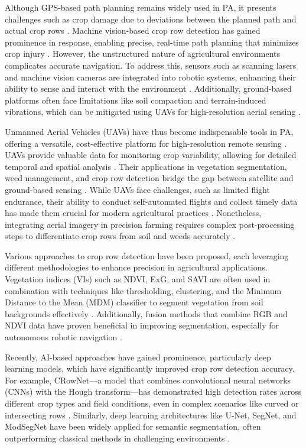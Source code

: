 \documentclass[conference]{IEEEtran}
\begin{document}
	Although GPS-based path planning remains widely used in PA, it presents challenges such as crop damage due to deviations between the planned path and actual crop rows \cite{b1}. Machine vision-based crop row detection has gained prominence in response, enabling precise, real-time path planning that minimizes crop injury \cite{b1,b8}. However, the unstructured nature of agricultural environments complicates accurate navigation. To address this, sensors such as scanning lasers and machine vision cameras are integrated into robotic systems, enhancing their ability to sense and interact with the environment \cite{b2,b3}. Additionally, ground-based platforms often face limitations like soil compaction and terrain-induced vibrations, which can be mitigated using UAVs for high-resolution aerial sensing \cite{b10}.
	
	Unmanned Aerial Vehicles (UAVs) have thus become indispensable tools in PA, offering a versatile, cost-effective platform for high-resolution remote sensing \cite{b9,b12}. UAVs provide valuable data for monitoring crop variability, allowing for detailed temporal and spatial analysis \cite{b10,b12}. Their applications in vegetation segmentation, weed management, and crop row detection bridge the gap between satellite and ground-based sensing \cite{b7,b13}. While UAVs face challenges, such as limited flight endurance, their ability to conduct self-automated flights and collect timely data has made them crucial for modern agricultural practices \cite{b11,b13}. Nonetheless, integrating aerial imagery in precision farming requires complex post-processing steps to differentiate crop rows from soil and weeds accurately \cite{b6}.
	
	Various approaches to crop row detection have been proposed, each leveraging different methodologies to enhance precision in agricultural applications. Vegetation indices (VIs) such as NDVI, ExG, and SAVI are often used in combination with techniques like thresholding, clustering, and the Minimum Distance to the Mean (MDM) classifier to segment vegetation from soil backgrounds effectively \cite{b1,b6,b13}. Additionally, fusion methods that combine RGB and NDVI data have proven beneficial in improving segmentation, especially for autonomous robotic navigation \cite{b5}.
	
	Recently, AI-based approaches have gained prominence, particularly deep learning models, which have significantly improved crop row detection accuracy. For example, CRowNet—a model that combines convolutional neural networks (CNNs) with the Hough transform—has demonstrated high detection rates across different crop types and field conditions, even in complex scenarios like curved or intersecting rows \cite{b8,b14}. Similarly, deep learning architectures like U-Net, SegNet, and ModSegNet have been widely applied for semantic segmentation, often outperforming classical methods in challenging environments \cite{b5,b13}.
	
\end{document}
